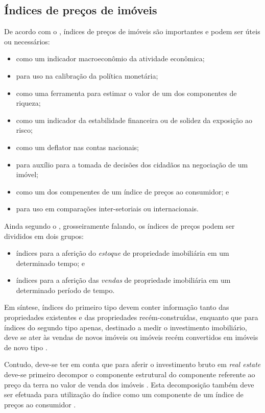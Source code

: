 \documentclass[
	12pt,				%
	oneside,			%
	a4paper,			%
	chapter=TITLE,		%
	section=TITLE,		%
	english,			%
	brazil				%
	]{abntex2}
\begin{document}
\subsection{Índices de preços de
imóveis}\label{uxedndices-de-preuxe7os-de-imuxf3veis}

De acordo com o \textcite{rppi}, índices de preços de imóveis são
importantes e podem ser úteis ou necessários:
\begin{itemize}
\tightlist
\item
  como um indicador macroeconômio da atividade econômica;
\item
  para uso na calibração da política monetária;
\item
  como uma ferramenta para estimar o valor de um dos componentes de
  riqueza;
\item
  como um indicador da estabilidade financeira ou de solidez da
  exposição ao risco;
\item
  como um deflator nas contas nacionais;
\item
  para auxílio para a tomada de decisões dos cidadãos na negociação de
  um imóvel;
\item
  como um dos compenentes de um índice de preços ao consumidor; e
\item
  para uso em comparações inter-setoriais ou internacionais.
\end{itemize}
Ainda segundo o \textcite{rppi}, grosseiramente falando, os índices de
preços podem ser divididos em dois grupos:
\begin{itemize}
\tightlist
\item
  índices para a aferição do \emph{estoque} de propriedade imobiliária
  em um determinado tempo; e
\item
  índices para a aferição das \emph{vendas} de propriedade imobiliária
  em um determinado período de tempo.
\end{itemize}
Em síntese, índices do primeiro tipo devem conter informação tanto das
propriedades existentes e das propriedades recém-construídas, enquanto
que para índices do segundo tipo apenas, destinado a medir o
investimento imobiliário, deve se ater às vendas de novos imóveis ou
imóveis recém convertidos em imóveis de novo tipo \autocite[155]{rppi}.

Contudo, deve-se ter em conta que para aferir o investimento bruto em
\emph{real estate} deve-se primeiro decompor o componente estrutural do
componente referente ao preço da terra no valor de venda dos imóveis
\autocite[155]{rppi}. Esta decomposição também deve ser efetuada para
utilização do índice como um componente de um índice de preços ao
consumidor \autocite[156]{rppi}.
\end{document}
